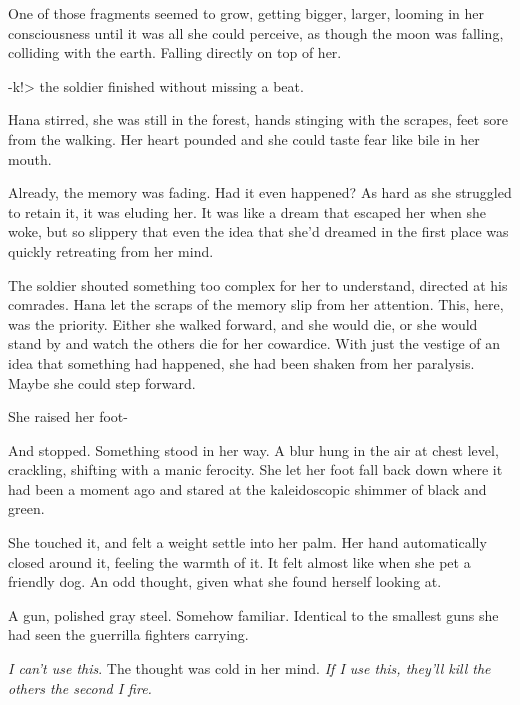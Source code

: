 One of those fragments seemed to grow, getting bigger, larger, looming in her consciousness until it was all she could perceive, as though the moon was falling, colliding with the earth.  Falling directly on top of her.



-k!> the soldier finished without missing a beat.



Hana stirred, she was still in the forest, hands stinging with the scrapes, feet sore from the walking.  Her heart pounded and she could taste fear like bile in her mouth.



Already, the memory was fading.  Had it even happened?  As hard as she struggled to retain it, it was eluding her.  It was like a dream that escaped her when she woke, but so slippery that even the idea that she'd dreamed in the first place was quickly retreating from her mind.



The soldier shouted something too complex for her to understand, directed at his comrades.  Hana let the scraps of the memory slip from her attention.  This, here, was the priority.  Either she walked forward, and she would die, or she would stand by and watch the others die for her cowardice.  With just the vestige of an idea that something had happened, she had been shaken from her paralysis.  Maybe she could step forward.



She raised her foot-



And stopped.  Something stood in her way.  A blur hung in the air at chest level, crackling, shifting with a manic ferocity.  She let her foot fall back down where it had been a moment ago and stared at the kaleidoscopic shimmer of black and green.



She touched it, and felt a weight settle into her palm.  Her hand automatically closed around it, feeling the warmth of it.  It felt almost like when she pet a friendly dog.  An odd thought, given what she found herself looking at.



A gun, polished gray steel.  Somehow familiar.  Identical to the smallest guns she had seen the guerrilla fighters carrying.



\emph{I can't use this}.  The thought was cold in her mind.  \emph{If I use this, they'll kill the others the second I fire.}



